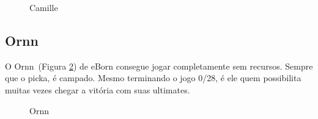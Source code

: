 \begin{multicols}{2}
	\begin{figure}[H]
		\begin{center}
			\caption{Camille}
			\label{fig:camille}
		\end{center}
	\end{figure}
	
	\subsection*{Ornn}
	O Ornn~(Figura \ref{fig:ornn}) de eBorn consegue jogar completamente sem recursos. Sempre que o picka, é campado. Mesmo terminando o jogo 0/28, é ele quem possibilita muitas vezes chegar a vitória com suas ultimates.
	
	\begin{figure}[H]
		\begin{center}
			\caption{Ornn}
			\label{fig:ornn}
		\end{center}
	\end{figure}
	

\end{multicols}
